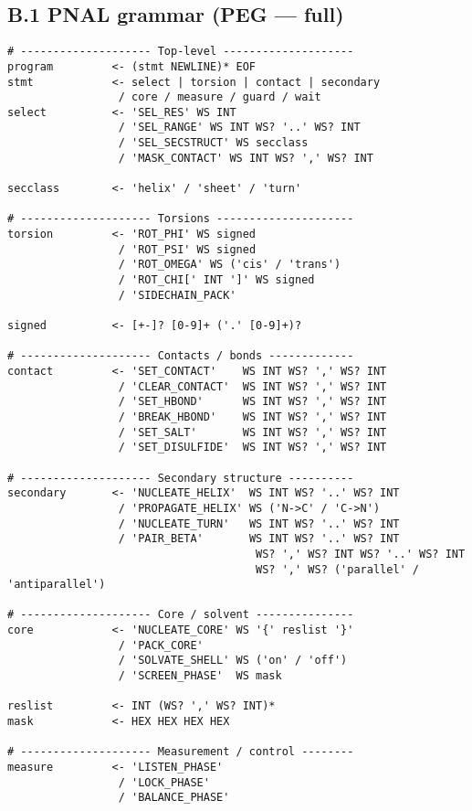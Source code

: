 \documentclass[12pt,a4paper]{article}
\begin{document}
\subsection*{B.1 PNAL grammar (PEG — full)}
\begin{verbatim}
# -------------------- Top-level --------------------
program         <- (stmt NEWLINE)* EOF
stmt            <- select | torsion | contact | secondary
                 / core / measure / guard / wait
select          <- 'SEL_RES' WS INT
                 / 'SEL_RANGE' WS INT WS? '..' WS? INT
                 / 'SEL_SECSTRUCT' WS secclass
                 / 'MASK_CONTACT' WS INT WS? ',' WS? INT

secclass        <- 'helix' / 'sheet' / 'turn'

# -------------------- Torsions ---------------------
torsion         <- 'ROT_PHI' WS signed
                 / 'ROT_PSI' WS signed
                 / 'ROT_OMEGA' WS ('cis' / 'trans')
                 / 'ROT_CHI[' INT ']' WS signed
                 / 'SIDECHAIN_PACK'

signed          <- [+-]? [0-9]+ ('.' [0-9]+)?

# -------------------- Contacts / bonds -------------
contact         <- 'SET_CONTACT'    WS INT WS? ',' WS? INT
                 / 'CLEAR_CONTACT'  WS INT WS? ',' WS? INT
                 / 'SET_HBOND'      WS INT WS? ',' WS? INT
                 / 'BREAK_HBOND'    WS INT WS? ',' WS? INT
                 / 'SET_SALT'       WS INT WS? ',' WS? INT
                 / 'SET_DISULFIDE'  WS INT WS? ',' WS? INT

# -------------------- Secondary structure ----------
secondary       <- 'NUCLEATE_HELIX'  WS INT WS? '..' WS? INT
                 / 'PROPAGATE_HELIX' WS ('N->C' / 'C->N')
                 / 'NUCLEATE_TURN'   WS INT WS? '..' WS? INT
                 / 'PAIR_BETA'       WS INT WS? '..' WS? INT
                                      WS? ',' WS? INT WS? '..' WS? INT
                                      WS? ',' WS? ('parallel' / 'antiparallel')

# -------------------- Core / solvent ---------------
core            <- 'NUCLEATE_CORE' WS '{' reslist '}'
                 / 'PACK_CORE'
                 / 'SOLVATE_SHELL' WS ('on' / 'off')
                 / 'SCREEN_PHASE'  WS mask

reslist         <- INT (WS? ',' WS? INT)*
mask            <- HEX HEX HEX HEX

# -------------------- Measurement / control --------
measure         <- 'LISTEN_PHASE'
                 / 'LOCK_PHASE'
                 / 'BALANCE_PHASE'


\end{verbatim}
\end{document}

